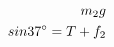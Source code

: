 \documentclass[preview]{standalone}
\begin{document}
\begin{align*}
\special{dvisvgm:raw <g id='unique000'>}m_2 g \\sin 37^{\circ} = T + f_2\special{dvisvgm:raw </g>}
\end{align*}
\end{document}
